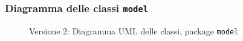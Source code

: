 \subsubsection{Diagramma delle classi \texttt{model}}
\vspace{0.5cm}
\begin{figure}[H]
    \centering
    \caption{Versione 2: Diagramma UML delle classi, package \texttt{model}}
    \label{fig:class_model_v_2}
\end{figure}